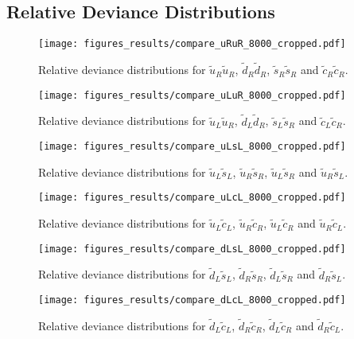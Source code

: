 \documentclass[twoside,english]{uiofysmaster}
\begin{document}
{\begin{appendices}
\chapter{Relative Deviance Distributions}\label{App:: Relative Deviance Distributions}


\begin{figure}
\centering
\texttt{[image: figures\_results/compare\_uRuR\_8000\_cropped.pdf]}
\caption{Relative deviance distributions for $\widetilde{u}_R \widetilde{u}_R$, $\widetilde{d}_R \widetilde{d}_R$, $\widetilde{s}_R \widetilde{s}_R$ and $\widetilde{c}_R \widetilde{c}_R$.}
\end{figure}

\begin{figure}
\centering
\texttt{[image: figures\_results/compare\_uLuR\_8000\_cropped.pdf]}
\caption{Relative deviance distributions for $\widetilde{u}_L \widetilde{u}_R$, $\widetilde{d}_L \widetilde{d}_R$, $\widetilde{s}_L \widetilde{s}_R$ and $\widetilde{c}_L \widetilde{c}_R$.}
\end{figure}

\begin{figure}
\centering
\texttt{[image: figures\_results/compare\_uLsL\_8000\_cropped.pdf]}
\caption{Relative deviance distributions for $\widetilde{u}_L \widetilde{s}_L$, $\widetilde{u}_R \widetilde{s}_R$, $\widetilde{u}_L \widetilde{s}_R$ and $\widetilde{u}_R \widetilde{s}_L$.}
\end{figure}

\begin{figure}
\centering
\texttt{[image: figures\_results/compare\_uLcL\_8000\_cropped.pdf]}
\caption{Relative deviance distributions for $\widetilde{u}_L \widetilde{c}_L$, $\widetilde{u}_R \widetilde{c}_R$, $\widetilde{u}_L \widetilde{c}_R$ and $\widetilde{u}_R \widetilde{c}_L$.}
\end{figure}

\begin{figure}
\centering
\texttt{[image: figures\_results/compare\_dLsL\_8000\_cropped.pdf]}
\caption{Relative deviance distributions for $\widetilde{d}_L \widetilde{s}_L$, $\widetilde{d}_R \widetilde{s}_R$, $\widetilde{d}_L \widetilde{s}_R$ and $\widetilde{d}_R \widetilde{s}_L$.}
\end{figure}

\begin{figure}
\centering
\texttt{[image: figures\_results/compare\_dLcL\_8000\_cropped.pdf]}
\caption{Relative deviance distributions for $\widetilde{d}_L \widetilde{c}_L$, $\widetilde{d}_R \widetilde{c}_R$, $\widetilde{d}_L \widetilde{c}_R$ and $\widetilde{d}_R \widetilde{c}_L$.}
\end{figure}


\end{appendices}}
\end{document}
